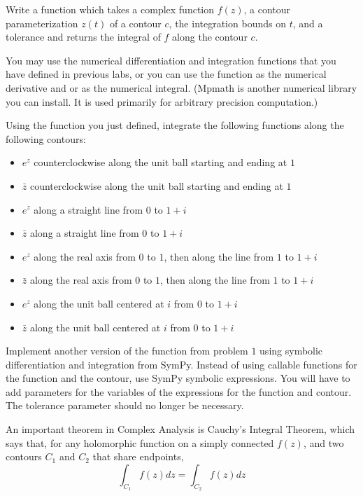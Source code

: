 \begin{problem}
Write a function which takes a complex function $f(z)$, a contour parameterization $z(t)$ of a contour $c$, the integration bounds on $t$, and a tolerance and returns the integral of $f$ along the contour $c$. 

You may use the numerical differentiation and integration functions that you have defined in previous labs, or you can use the function  as the numerical derivative and  or  as the numerical integral. (Mpmath is another numerical library you can install. It is used primarily for arbitrary precision computation.)
\end {problem}
\begin{problem}
Using the function you just defined, integrate the following functions along the following contours:
\begin{itemize}
\item $e^z$ counterclockwise along the unit ball starting and ending at $1$
\item $\bar{z}$ counterclockwise along the unit ball starting and ending at $1$
\item $e^z$ along a straight line from $0$ to $1+i$
\item $\bar{z}$ along a straight line from $0$ to $1+i$
\item $e^z$ along the real axis from $0$ to $1$, then along the line from $1$ to $1+i$
\item $\bar{z}$ along the real axis from $0$ to $1$, then along the line from $1$ to $1+i$
\item $e^z$ along the unit ball centered at $i$ from $0$ to $1+i$
\item $\bar{z}$ along the unit ball centered at $i$ from $0$ to $1+i$
\end{itemize}
\end{problem}

\begin{problem}
Implement another version of the function from problem $1$ using symbolic differentiation and integration from SymPy. Instead of using callable functions for the function and the contour, use SymPy symbolic expressions. You will have to add parameters for the variables of the expressions for the function and contour. The tolerance parameter should no longer be necessary.
\end{problem}

An important theorem in Complex Analysis is Cauchy's Integral Theorem, which says that, for any holomorphic function on a simply connected  $f(z)$, and two contours $C_1$ and $C_2$ that share endpoints, $$\int_{C_1}f(z)dz = \int_{C_2}f(z)dz$$

